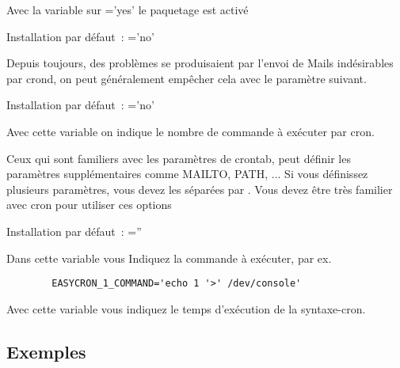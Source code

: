 \begin{description}

         Avec la variable sur ='yes' le paquetage est activé

         Installation par défaut~: ='no'


         Depuis toujours, des problèmes se produisaient par l'envoi de Mails
         indésirables par crond, on peut généralement empêcher cela avec le
         paramètre suivant.

         Installation par défaut~: ='no'


         Avec cette variable on indique le nombre de commande à exécuter
         par cron.


         Ceux qui sont familiers avec les paramètres de crontab, peut définir
         les paramètres supplémentaires comme MAILTO, PATH, ... Si vous définissez
         plusieurs paramètres, vous devez les séparées par \var{$\backslash\backslash$}.
         Vous devez être très familier avec cron pour utiliser ces options

         Installation par défaut~: =''


         Dans cette variable  vous Indiquez la
         commande à exécuter, par ex.
\begin{example}
\begin{verbatim}
        EASYCRON_1_COMMAND='echo 1 '>' /dev/console'
\end{verbatim}
\end{example}


         Avec cette variable  vous indiquez le temps
         d'exécution de la syntaxe-cron.


\subsection{Exemples}


\end{description}
